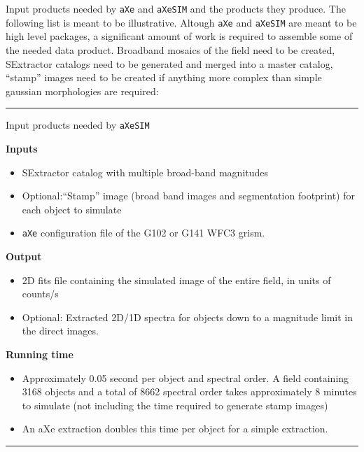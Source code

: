 \documentclass[preprint]{aastex}
\begin{document}
Input products needed by \texttt{aXe} and \texttt{aXeSIM} and the products they produce. The following list is meant to be illustrative. Altough \texttt{aXe} and \texttt{aXeSIM} are meant to be high level packages, a significant amount of work is required to assemble some of the needed data product. Broadband mosaics of the field need to be created, SExtractor catalogs need to be generated and merged into a master catalog, ``stamp'' images need to be created if anything more complex than simple gaussian morphologies are required:

\noindent\hfil\rule{0.5\textwidth}{.4pt}\hfil

\centerline{Input products needed by \texttt{aXeSIM}}
\noindent \textbf{Inputs}
\begin{itemize}
\item SExtractor catalog with multiple broad-band magnitudes
\item Optional:``Stamp'' image (broad band images and segmentation footprint) for each object to simulate 
\item \texttt{aXe} configuration file of the G102 or G141 WFC3 grism.
\end{itemize}
\noindent \textbf{Output}
\begin{itemize}
\item 2D fits file containing the simulated image of the entire field, in units of counts/s
\item Optional: Extracted 2D/1D spectra for objects down to a magnitude limit in the direct images.
\end{itemize}

\noindent \textbf{Running time}
\begin{itemize}
\item Approximately 0.05 second per object and spectral order. A field containing 3168 objects and a total of 8662 spectral order takes approximately 8 minutes to simulate (not including the time required to generate stamp images)
\item An aXe extraction doubles this time per object for a simple extraction.
\end{itemize}

\noindent\hfil\rule{0.5\textwidth}{.4pt}\hfil
\end{document}
